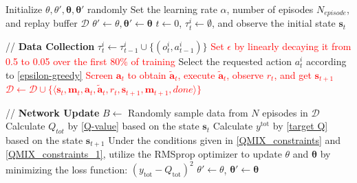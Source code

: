 \documentclass[journal]{IEEEtran}
\newcommand{\newrev}[1]{\textcolor{red}{#1}}
\begin{document}
\begin{algorithm}[t]
    \caption{MBA-RL charging control framework}
    \label{alg:QMIX}
    
    \begin{algorithmic}[1]
        \STATE Initialize $\theta, \theta', \bm{\theta}, \bm{\theta}'$ randomly
        \STATE Set the learning rate $\alpha$, number of episodes $N_{episode}$, and replay buffer $\mathcal{D}$
        \STATE $\theta' \leftarrow \theta, \bm{\theta}' \leftarrow \bm{\theta}$
            \STATE $t\leftarrow 0$, $\tau_t^i \leftarrow \emptyset$, and observe the initial state $\mathbf{s}_t$

            // \textbf{Data Collection}
                    \STATE $\tau_t^i \leftarrow \tau_{t-1}^i \cup \{(o_t^i, a_{t-1}^i)\}$
                    \STATE \newrev{Set $\epsilon$ by linearly decaying it from 0.5 to 0.05 over the first 80\% of training}
                    \STATE Select the requested action $a_t^i$ according to \eqref{epsilon-greedy}
                \ENDFOR
                \STATE \newrev{Screen $\mathbf{a}_t$ to obtain $\tilde{\mathbf{a}}_t$, execute $\tilde{\mathbf{a}}_t$, observe $r_t$, and get $\mathbf{s}_{t+1}$}
                \STATE \newrev{$\mathcal{D} \leftarrow \mathcal{D} \cup \{ \langle\mathbf{s}_t, \mathbf{m}_t, \mathbf{a}_t, \tilde{\mathbf{a}}_t, r_t, \mathbf{s}_{t+1}, \mathbf{m}_{t+1}, done\rangle \}$}
            \ENDWHILE
            
            // \textbf{Network Update}
                \STATE $B \leftarrow$ Randomly sample data from $N$ episodes in $\mathcal{D}$
                    \STATE Calculate $Q_{tot}$ by \eqref{Q-value} based on the state $\mathbf{s}_t$
                    \STATE Calculate $y^{\text{tot}}$ by \eqref{target Q} based on the state $\mathbf{s}_{t+1}$
                \ENDFOR
                \STATE Under the conditions given in \eqref{QMIX_constraints} and \eqref{QMIX_constraints_1}, utilize the RMSprop  optimizer \cite{zou2019sufficient} to update $\theta$ and $\bm{\theta}$ by minimizing the loss function: $\left( y_{\text{tot}} - Q_{\text{tot}} \right)^2$
            \ENDIF
                \STATE $\theta' \leftarrow \theta$, $\bm{\theta}' \leftarrow \bm{\theta}$ 
            \ENDIF
        \ENDFOR
    \end{algorithmic}
\end{algorithm}
\end{document}
